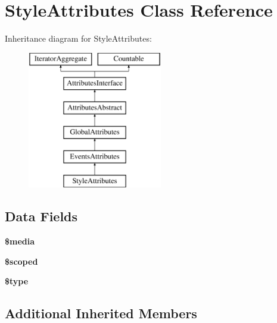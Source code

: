 \hypertarget{class_pes_1_1_dom_1_1_node_1_1_attributes_1_1_style_attributes}{}\section{Style\+Attributes Class Reference}
\label{class_pes_1_1_dom_1_1_node_1_1_attributes_1_1_style_attributes}
Inheritance diagram for Style\+Attributes\+:\begin{figure}[H]
\begin{center}
\leavevmode
\includegraphics[height=6.000000cm]{class_pes_1_1_dom_1_1_node_1_1_attributes_1_1_style_attributes}
\end{center}
\end{figure}
\subsection*{Data Fields}
\begin{DoxyCompactItemize}
\item 
\mbox{\label{class_pes_1_1_dom_1_1_node_1_1_attributes_1_1_style_attributes_a78eb168f8ffe2a51bff5f761a158c7cf}} 
{\bfseries \$media}
\item 
\mbox{\label{class_pes_1_1_dom_1_1_node_1_1_attributes_1_1_style_attributes_a98c4d08b342bf69bb5c6def0d155f7c1}} 
{\bfseries \$scoped}
\item 
\mbox{\label{class_pes_1_1_dom_1_1_node_1_1_attributes_1_1_style_attributes_a9a4a6fba2208984cabb3afacadf33919}} 
{\bfseries \$type}
\end{DoxyCompactItemize}
\subsection*{Additional Inherited Members}


